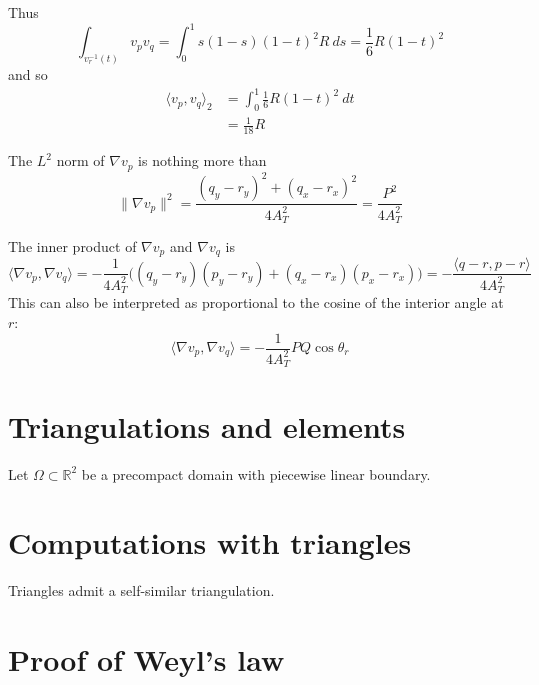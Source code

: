 \documentclass[12pt]{amsart}
\begin{document}
Thus
\[ \int_{v_r^{-1}(t)} v_pv_q = \int_0^1 s(1-s)(1-t)^2 R\ ds = \frac{1}{6}R(1-t)^2 \]
and so
\begin{align*}
\langle v_p, v_q\rangle_2 &= \int_0^1 \frac{1}{6} R(1-t)^2\ dt \\
	&= \frac{1}{18}R
\end{align*}

The $L^2$ norm of $\nabla v_p$ is nothing more than
\[\|\nabla v_p \|^2 = \frac{(q_y - r_y)^2 + (q_x - r_x)^2}{4A_T^2} = \frac{P^2}{4A_T^2} \]

The inner product of $\nabla v_p$ and $\nabla v_q$ is
\[ \langle \nabla v_p, \nabla v_q \rangle = -\frac{1}{4A_T^2}\bigg( (q_y - r_y)(p_y - r_y) + (q_x - r_x)(p_x - r_x)\bigg) = -\frac{\langle q-r, p-r\rangle}{4A_T^2} \]
This can also be interpreted as proportional to the cosine of the interior angle at $r$:
\[ \langle \nabla v_p, \nabla v_q\rangle = -\frac{1}{4A_T^2}PQ\cos\theta_r\]

\section*{Triangulations and elements}

Let $\Omega\subset\mathbb{R}^2$ be a precompact domain with piecewise linear boundary.



\section*{Computations with triangles}

Triangles admit a self-similar triangulation.

\section*{Proof of Weyl's law}





\end{document}

